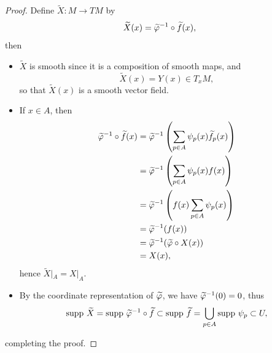 \begin{proof}
    Define $\widetilde{X}:M \to TM$ by 
    $$ \widetilde{X}(x) = \widetilde{\varphi}^{-1} \circ \widetilde{f}(x),$$
    then 
    \begin{itemize}
    \item $\widetilde{X}$ is smooth since it is a composition of smooth maps, and
    $$\widetilde{X}(x) = Y(x) \in T_x M, $$
    so that $\widetilde{X}(x)$ is a smooth vector field. 
    \item If $x \in A$, then 
    \begin{align*}
        \widetilde{\varphi}^{-1} \circ \widetilde{f}(x) 
        &= \widetilde{\varphi}^{-1}\left(\sum_{p \in A}\psi_p(x)\widetilde{f}_p(x)\right) \\
        &= \widetilde{\varphi}^{-1}\left(\sum_{p \in A}\psi_p(x) f(x)\right) \\
        &= \widetilde{\varphi}^{-1}\left(f(x) \sum_{p \in A}\psi_p(x)\right) \\
        &= \widetilde{\varphi}^{-1}(f(x)) \\
        &= \widetilde{\varphi}^{-1}(\widetilde{\varphi} \circ X(x)) \\
        &= X(x),
    \end{align*}
    hence $\widetilde{X}|_A = X|_A$.
    \item By the coordinate representation of $\widetilde{\varphi}$, we have $\widetilde{\varphi}^{-1}(0) = 0$, thus
    $$\mathrm{supp~} \widetilde{X} = \mathrm{supp~} \widetilde{\varphi}^{-1} \circ \widetilde{f} \subset \mathrm{supp~} \widetilde{f} = \bigcup_{p \in A}\mathrm{supp~} \psi_p \subset U, $$
    \end{itemize}
    completing the proof. 
\end{proof}
